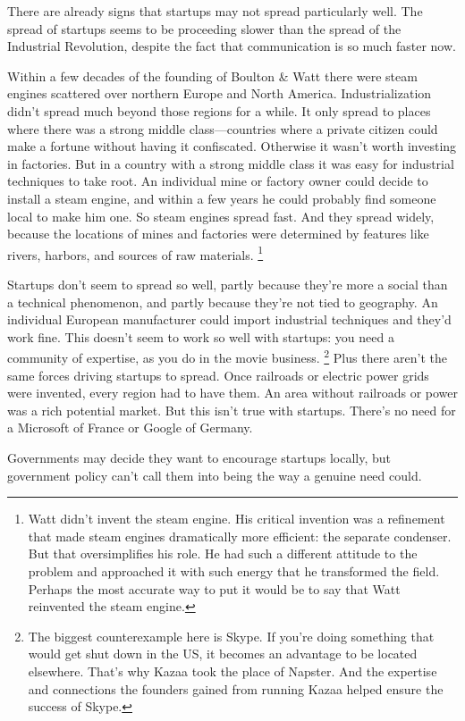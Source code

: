 There are already signs that startups may not spread particularly well.
The spread of startups seems to be proceeding slower than the spread of
the Industrial Revolution, despite the fact that communication is so
much faster now.

Within a few decades of the founding of Boulton \& Watt there were steam
engines scattered over northern Europe and North America.
Industrialization didn't spread much beyond those regions for a while.
It only spread to places where there was a strong middle
class---countries where a private citizen could make a fortune without
having it confiscated. Otherwise it wasn't worth investing in factories.
But in a country with a strong middle class it was easy for industrial
techniques to take root. An individual mine or factory owner could
decide to install a steam engine, and within a few years he could
probably find someone local to make him one. So steam engines spread
fast. And they spread widely, because the locations of mines and
factories were determined by features like rivers, harbors, and sources
of raw materials. \footnote{Watt didn't invent the steam engine. His critical invention was
a refinement that made steam engines dramatically more efficient: the
separate condenser. But that oversimplifies his role. He had such a
different attitude to the problem and approached it with such energy
that he transformed the field. Perhaps the most accurate way to put it
would be to say that Watt reinvented the steam engine.}

Startups don't seem to spread so well, partly because they're more a
social than a technical phenomenon, and partly because they're not tied
to geography. An individual European manufacturer could import
industrial techniques and they'd work fine. This doesn't seem to work so
well with startups: you need a community of expertise, as you do in the
movie business. \footnote{The biggest counterexample here is Skype. If you're doing
something that would get shut down in the US, it becomes an advantage to
be located elsewhere. That's why Kazaa took the place of Napster. And
the expertise and connections the founders gained from running Kazaa
helped ensure the success of Skype.} Plus there aren't the same
forces driving startups to spread. Once railroads or electric power
grids were invented, every region had to have them. An area without
railroads or power was a rich potential market. But this isn't true with
startups. There's no need for a Microsoft of France or Google of
Germany.

Governments may decide they want to encourage startups locally, but
government policy can't call them into being the way a genuine need
could.

